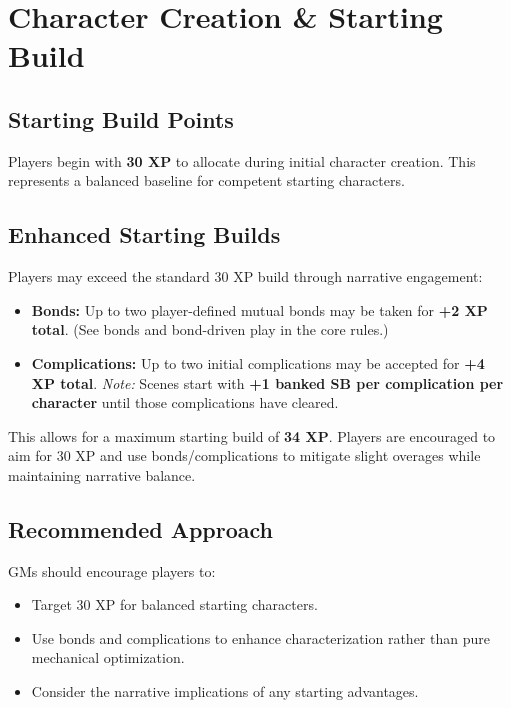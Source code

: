 
\section{Character Creation \& Starting Build}

\subsection{Starting Build Points}
Players begin with \textbf{30 XP} to allocate during initial character creation. This represents a balanced baseline for competent starting characters.

\subsection{Enhanced Starting Builds}
Players may exceed the standard 30 XP build through narrative engagement:
\begin{itemize}
  \item \textbf{Bonds:} Up to two player-defined mutual bonds may be taken for \textbf{+2 XP total}. (See bonds and bond-driven play in the core rules.)
  \item \textbf{Complications:} Up to two initial complications may be accepted for \textbf{+4 XP total}. \emph{Note:} Scenes start with \textbf{+1 banked SB per complication per character} until those complications have cleared.
\end{itemize}
This allows for a maximum starting build of \textbf{34 XP}. Players are encouraged to aim for 30 XP and use bonds/complications to mitigate slight overages while maintaining narrative balance.

\subsection{Recommended Approach}
GMs should encourage players to:
\begin{itemize}
  \item Target 30 XP for balanced starting characters.
  \item Use bonds and complications to enhance characterization rather than pure mechanical optimization.
  \item Consider the narrative implications of any starting advantages.
\end{itemize}

